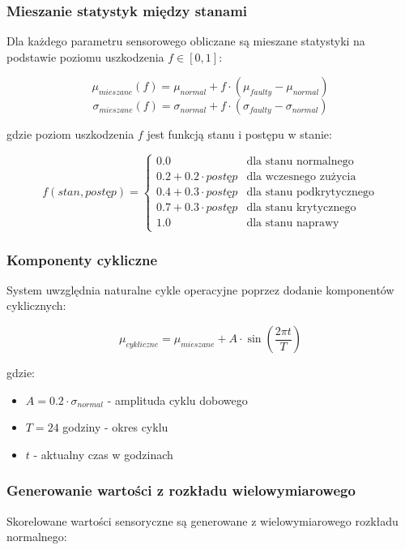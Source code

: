 \subsubsection{Mieszanie statystyk między stanami}

Dla każdego parametru sensorowego obliczane są mieszane statystyki na podstawie poziomu uszkodzenia $f \in [0, 1]$:

$$\mu_{mieszane}(f) = \mu_{normal} + f \cdot (\mu_{faulty} - \mu_{normal})$$
$$\sigma_{mieszane}(f) = \sigma_{normal} + f \cdot (\sigma_{faulty} - \sigma_{normal})$$

gdzie poziom uszkodzenia $f$ jest funkcją stanu i postępu w stanie:

$$f(stan, postęp) = \begin{cases}
0.0 & \text{dla stanu normalnego} \\
0.2 + 0.2 \cdot postęp & \text{dla wczesnego zużycia} \\
0.4 + 0.3 \cdot postęp & \text{dla stanu podkrytycznego} \\
0.7 + 0.3 \cdot postęp & \text{dla stanu krytycznego} \\
1.0 & \text{dla stanu naprawy}
\end{cases}$$

\subsubsection{Komponenty cykliczne}

System uwzględnia naturalne cykle operacyjne poprzez dodanie komponentów cyklicznych:

$$\mu_{cykliczne} = \mu_{mieszane} + A \cdot \sin\left(\frac{2\pi t}{T}\right)$$

gdzie:
\begin{itemize}
    \item $A = 0.2 \cdot \sigma_{normal}$ - amplituda cyklu dobowego
    \item $T = 24$ godziny - okres cyklu
    \item $t$ - aktualny czas w godzinach
\end{itemize}

\subsubsection{Generowanie wartości z rozkładu wielowymiarowego}

Skorelowane wartości sensoryczne są generowane z wielowymiarowego rozkładu normalnego:

